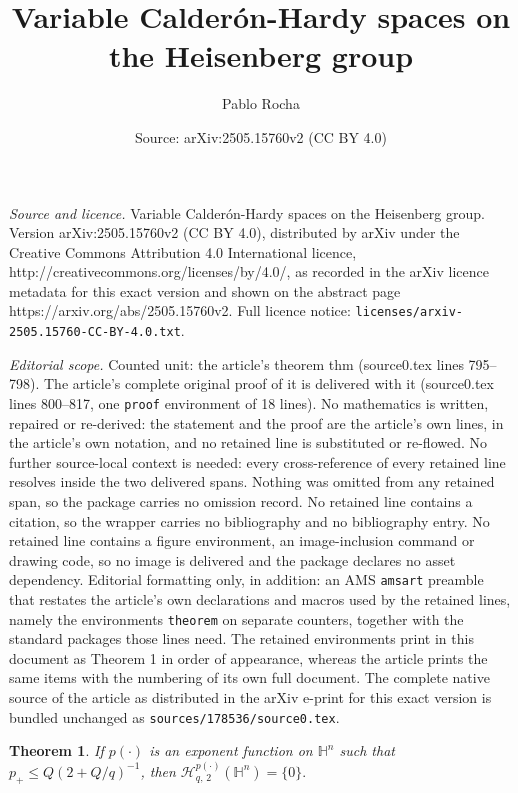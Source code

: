 \documentclass[10pt,a4paper]{amsart}
\title{Variable Calder\'on-Hardy spaces on the Heisenberg group}
\author{Pablo Rocha}
\date{Source: arXiv:2505.15760v2 (CC BY 4.0)}
\newtheorem{theorem}{Theorem}
\begin{document}
\maketitle

\noindent\emph{Source and licence.} Variable Calder\'on-Hardy spaces on the Heisenberg group. Version arXiv:2505.15760v2 (CC BY 4.0), distributed by arXiv under the Creative Commons Attribution 4.0 International licence, http://creativecommons.org/licenses/by/4.0/, as recorded in the arXiv licence metadata for this exact version and shown on the abstract page https://arxiv.org/abs/2505.15760v2. Full licence notice: \texttt{licenses/arxiv-2505.15760-CC-BY-4.0.txt}.\par\smallskip

\noindent\textit{Editorial scope.} Counted unit: the article's theorem thm (source0.tex lines 795--798). The article's complete original proof of it is delivered with it (source0.tex lines 800--817, one \texttt{proof} environment of 18 lines). No mathematics is written, repaired or re-derived: the statement and the proof are the article's own lines, in the article's own notation, and no retained line is substituted or re-flowed.  No further source-local context is needed: every cross-reference of every retained line resolves inside the two delivered spans.  Nothing was omitted from any retained span, so the package carries no omission record.  No retained line contains a citation, so the wrapper carries no bibliography and no bibliography entry.  No retained line contains a figure environment, an image-inclusion command or drawing code, so no image is delivered and the package declares no asset dependency.  Editorial formatting only, in addition: an AMS \texttt{amsart} preamble that restates the article's own declarations and macros used by the retained lines, namely the environments \texttt{theorem} on separate counters, together with the standard packages those lines need.  The retained environments print in this document as Theorem 1 in order of appearance, whereas the article prints the same items with the numbering of its own full document.  The complete native source of the article as distributed in the arXiv e-print for this exact version is bundled unchanged as \texttt{sources/178536/source0.tex}.
\begin{theorem} \label{second thm}
If $p(\cdot)$ is an exponent function on $\mathbb{H}^n$ such that $p_{+} \leq Q (2 + Q/q)^{-1}$, then 
$\mathcal{H}^{p(\cdot)}_{q, \, 2}(\mathbb{H}^{n}) = \{ 0 \}.$
\end{theorem}
\end{document}
